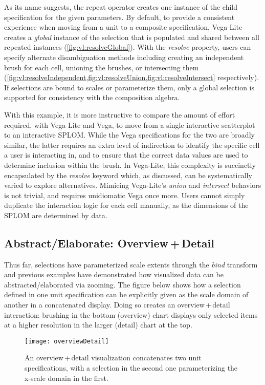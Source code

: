 As its name suggests, the repeat operator creates one instance of the child
specification for the given parameters. By default, to provide a consistent
experience when moving from a unit to a composite specification, Vega-Lite
creates a \emph{global} instance of the selection that is populated and shared
between all repeated instances (\cref{fig:vl:resolveGlobal}). With the
\emph{resolve} property, users can specify alternate disambiguation methods
including creating an independent brush for each cell, unioning the brushes, or
intersecting them
(\cref{fig:vl:resolveIndependent,fig:vl:resolveUnion,fig:vl:resolveIntersect}
respectively). If selections are bound to scales or parameterize them, only a
global selection is supported for consistency with the composition algebra.

With this example, it is more instructive to compare the amount of effort
required, with Vega-Lite and Vega, to move from a single interactive scatterplot
to an interactive SPLOM. While the Vega specifications for the two are broadly
similar, the latter requires an extra level of indirection to identify the
specific cell a user is interacting in, and to ensure that the correct data
values are used to determine inclusion within the brush. In Vega-Lite, this
complexity is succinctly encapsulated by the \emph{resolve} keyword which, as
discussed, can be systematically varied to explore alternatives. Mimicing
Vega-Lite's \emph{union} and \emph{intersect} behaviors is not trivial, and
requires unidiomatic Vega once more. Users cannot simply duplicate the
interaction logic for each cell manually, as the dimensions of the SPLOM are
determined by data.

\subsection{Abstract/Elaborate: Overview\,+\,Detail}

Thus far, selections have parameterized scale extents through the \emph{bind}
transform and previous examples have demonstrated how visualized data can be
abstracted/elaborated via zooming. The figure below shows how a selection
defined in one unit specification can be explicitly given as the scale domain of
another in a concatenated display. Doing so creates an overview\,+\,detail
interaction: brushing in the bottom (overview) chart displays only selected
items at a higher resolution in the larger (detail) chart at the top.

\begin{figure}[h!]
  \centering
  \texttt{[image: overviewDetail]}
  \caption{An overview\,+\,detail visualization concatenates two unit
  specifications, with a selection in the second one parameterizing the x-scale
  domain in the first.}
  \label{fig:vl:overviewDetail}
\end{figure}

